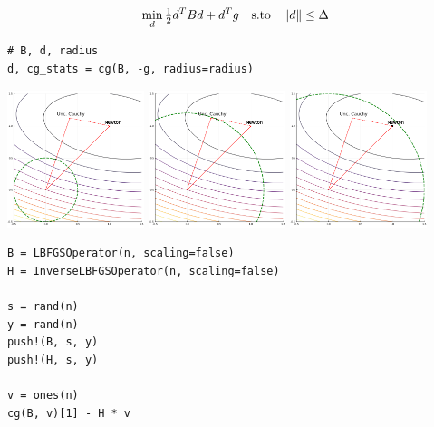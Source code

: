 \begin{frame}[fragile,t]
  \begin{minipage}{0.49\textwidth}
    $$ \min_d \tfrac{1}{2}d^TBd + d^Tg \quad \text{s.to} \quad \Vert d \Vert \leq \Delta $$
  \end{minipage}
  \begin{minipage}{0.49\textwidth}
\begin{lstlisting}
# B, d, radius
d, cg_stats = cg(B, -g, radius=radius)
\end{lstlisting}
  \end{minipage}
\begin{center}
  \includegraphics[width=0.3\textwidth]{src/krylov1.png}
  \includegraphics[width=0.3\textwidth]{src/krylov2.png}
  \includegraphics[width=0.3\textwidth]{src/krylov3.png}
\end{center}
\end{frame}

\begin{frame}[fragile,t]
\begin{lstlisting}
B = LBFGSOperator(n, scaling=false)
H = InverseLBFGSOperator(n, scaling=false)

s = rand(n)
y = rand(n)
push!(B, s, y)
push!(H, s, y)

v = ones(n)
cg(B, v)[1] - H * v
\end{lstlisting}
\end{frame}


